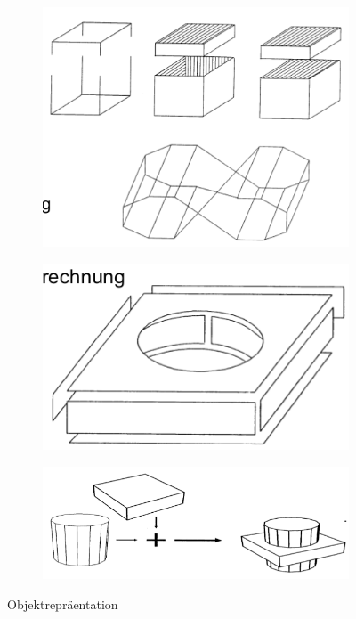 \begin{figure}[h!]
	\centering
	\begin{subfigure}{.25\textwidth}
		\includegraphics[width=\textwidth]{figures/ch02_kanten.png}
		\caption{}
	\end{subfigure}
	\begin{subfigure}{.25\textwidth}
		\includegraphics[width=\textwidth]{figures/ch02_flaechen.png}
		\caption{}
	\end{subfigure}
	\begin{subfigure}{.25\textwidth}
		\includegraphics[width=\textwidth]{figures/ch02_volumen.png}
		\caption{}
	\end{subfigure}
	\caption{Objektrepr\"{a}entation}
	\label{fig:obrepr}
\end{figure}
